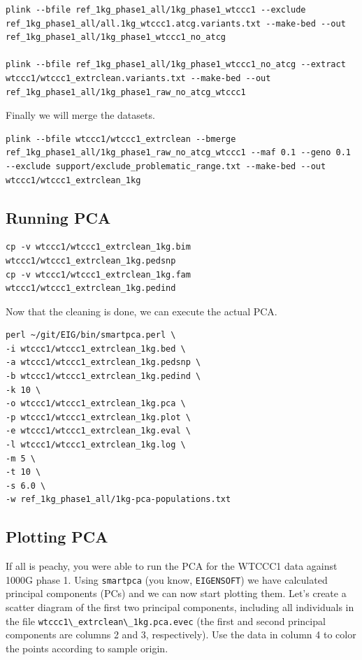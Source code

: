 \documentclass[
]{book}
\newcommand{\passthrough}[1]{#1}
\begin{document}
\begin{lstlisting}
plink --bfile ref_1kg_phase1_all/1kg_phase1_wtccc1 --exclude ref_1kg_phase1_all/all.1kg_wtccc1.atcg.variants.txt --make-bed --out ref_1kg_phase1_all/1kg_phase1_wtccc1_no_atcg

plink --bfile ref_1kg_phase1_all/1kg_phase1_wtccc1_no_atcg --extract wtccc1/wtccc1_extrclean.variants.txt --make-bed --out ref_1kg_phase1_all/1kg_phase1_raw_no_atcg_wtccc1
\end{lstlisting}

Finally we will merge the datasets.

\begin{lstlisting}
plink --bfile wtccc1/wtccc1_extrclean --bmerge ref_1kg_phase1_all/1kg_phase1_raw_no_atcg_wtccc1 --maf 0.1 --geno 0.1 --exclude support/exclude_problematic_range.txt --make-bed --out wtccc1/wtccc1_extrclean_1kg
\end{lstlisting}

\hypertarget{running-pca}{%
\subsection{Running PCA}\label{running-pca}}

\begin{lstlisting}
cp -v wtccc1/wtccc1_extrclean_1kg.bim wtccc1/wtccc1_extrclean_1kg.pedsnp
cp -v wtccc1/wtccc1_extrclean_1kg.fam wtccc1/wtccc1_extrclean_1kg.pedind
\end{lstlisting}

Now that the cleaning is done, we can execute the actual PCA.

\begin{lstlisting}
perl ~/git/EIG/bin/smartpca.perl \
-i wtccc1/wtccc1_extrclean_1kg.bed \
-a wtccc1/wtccc1_extrclean_1kg.pedsnp \
-b wtccc1/wtccc1_extrclean_1kg.pedind \
-k 10 \
-o wtccc1/wtccc1_extrclean_1kg.pca \
-p wtccc1/wtccc1_extrclean_1kg.plot \
-e wtccc1/wtccc1_extrclean_1kg.eval \
-l wtccc1/wtccc1_extrclean_1kg.log \
-m 5 \
-t 10 \
-s 6.0 \
-w ref_1kg_phase1_all/1kg-pca-populations.txt
\end{lstlisting}

\hypertarget{plotting-pca}{%
\subsection{Plotting PCA}\label{plotting-pca}}

If all is peachy, you were able to run the PCA for the WTCCC1 data against 1000G phase 1. Using \passthrough{\lstinline!smartpca!} (you know, \passthrough{\lstinline!EIGENSOFT!}) we have calculated principal components (PCs) and we can now start plotting them. Let's create a scatter diagram of the first two principal components, including all individuals in the file \passthrough{\lstinline!wtccc1\_extrclean\_1kg.pca.evec!} (the first and second principal components are columns 2 and 3, respectively). Use the data in column 4 to color the points according to sample origin.
\end{document}
